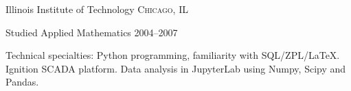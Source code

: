 \documentclass[10pt,a4paper]{article} %
\begin{document}


\spacedhrule{-0.2em}{-0.4em} %



\headedsection %
{Illinois Institute of Technology}
{\textsc{Chicago, IL}} {

\headedsubsection %
{Studied Applied Mathematics}
{2004--2007}
{}}


\spacedhrule{0.5em}{-0.4em} %



\inlineheadsection %
{Technical specialties:}
{Python programming, familiarity with SQL/ZPL/LaTeX.  Ignition SCADA platform.  Data analysis in JupyterLab using Numpy, Scipy and Pandas. }




\spacedhrule{1.6em}{-0.4em} %
\end{document}
